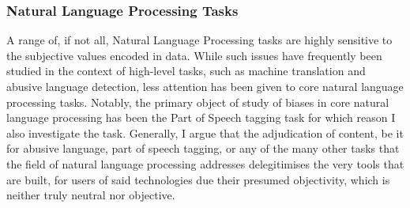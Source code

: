 {

\subsubsection{Natural Language Processing Tasks}
A range of, if not all, Natural Language Processing tasks are highly sensitive to the subjective values encoded in data.
While such issues have frequently been studied in the context of high-level tasks, such as machine translation and abusive language detection, less attention has been given to core natural language processing tasks.
Notably, the primary object of study of biases in core natural language processing has been the Part of Speech tagging task \citep{Blodgett:2016,Jorgensen:2016} for which reason I also investigate the task.
Generally, I argue that the adjudication of content, be it for abusive language, part of speech tagging, or any of the many other tasks that the field of natural language processing addresses delegitimises the very tools that are built, for users of said technologies due their presumed objectivity, which is neither truly neutral nor objective.

}
